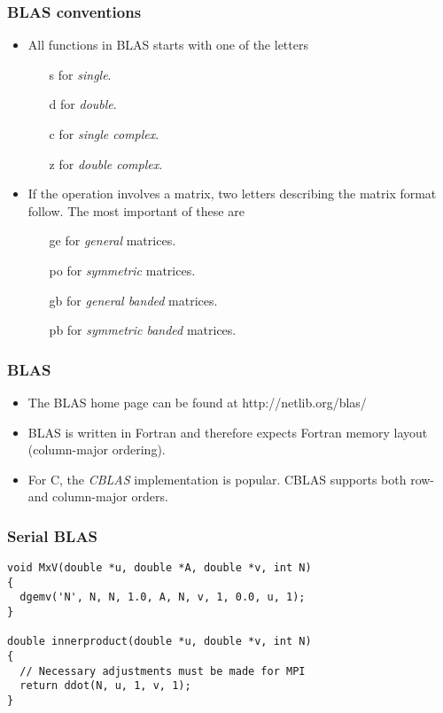 \begin{frame}
  \frametitle{BLAS conventions}
  \begin{itemize}
  \item All functions in BLAS starts with one of the letters
    \begin{itemize}
    \item[s] for \emph{single}.
    \item[d] for \emph{double}.
    \item[c] for \emph{single complex}.
    \item[z] for \emph{double complex}.
    \end{itemize}
  \item If the operation involves a matrix, two letters describing the matrix
    format follow. The most important of these are
    \begin{itemize}
    \item[ge] for \emph{general} matrices.
    \item[po] for \emph{symmetric} matrices.
    \item[gb] for \emph{general banded} matrices.
    \item[pb] for \emph{symmetric banded} matrices.
    \end{itemize}
  \end{itemize}
\end{frame}

\begin{frame}
  \frametitle{BLAS}
  \begin{itemize}
  \item The BLAS home page can be found at http://netlib.org/blas/
  \item BLAS is written in Fortran and therefore expects Fortran memory layout
    (column-major ordering).
  \item For C, the \emph{CBLAS} implementation is popular. CBLAS supports both
    row- and column-major orders.
  \end{itemize}
\end{frame}

\begin{frame}[fragile]
  \frametitle{Serial BLAS}
\begin{lstlisting}[style=c, basicstyle=\ttfamily\footnotesize]
void MxV(double *u, double *A, double *v, int N)
{
  dgemv('N', N, N, 1.0, A, N, v, 1, 0.0, u, 1);
}

double innerproduct(double *u, double *v, int N)
{
  // Necessary adjustments must be made for MPI
  return ddot(N, u, 1, v, 1);
}
\end{lstlisting}
\end{frame}


